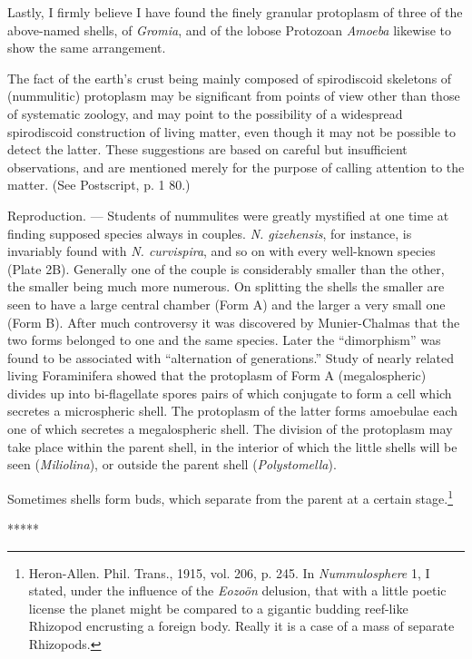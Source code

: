\documentclass[a4paper, 12pt, oneside]{article}
\begin{document}
Lastly, I firmly believe I have found the finely granular protoplasm of three of the above-named shells, of \emph{Gromia}, and of the lobose Protozoan \emph{Amoeba} likewise to show the same arrangement.

The fact of the earth's crust being mainly composed of spirodiscoid skeletons of (nummulitic) protoplasm may be significant from points of view other than those of systematic zoology, and may point to the possibility of a widespread spirodiscoid construction of living matter, even though it may not be possible to detect the latter. These suggestions are based on careful but insufficient observations, and are mentioned merely for the purpose of calling attention to the matter. (See Postscript, p. 1 80.)

Reproduction. --- Students of nummulites were greatly mystified at one time at finding supposed species always in couples. \emph{N. gizehensis}, for instance, is invariably found with \emph{N. curvispira}, and so on with every well-known species (Plate 2B). Generally one of the couple is considerably smaller than the other, the smaller being much more numerous. On splitting the shells the smaller are seen to have a large central chamber (Form A) and the larger a very small one (Form B). After much controversy it was discovered by Munier-Chalmas that the two forms belonged to one and the same species. Later the ``dimorphism'' was found to be associated with ``alternation of generations.'' Study of nearly related living Foraminifera showed that the protoplasm of Form A (megalospheric) divides up into bi-flagellate spores pairs of which conjugate to form a cell which secretes a microspheric shell. The protoplasm of the latter forms amoebulae each one of which secretes a megalospheric shell. The division of the protoplasm may take place within the parent shell, in the interior of which the little shells will be seen (\emph{Miliolina}), or outside the parent shell (\emph{Polystomella}).

Sometimes shells form buds, which separate from the parent at a certain stage.\footnote{Heron-Allen. Phil. Trans., 1915, vol. 206, p. 245. In \emph{Nummulosphere} 1, I stated, under the influence of the \emph{Eozoön} delusion, that with a little poetic license the planet might be compared to a gigantic budding reef-like Rhizopod encrusting a foreign body. Really it is a case of a mass of separate Rhizopods.}

\centerline{*\hspace{15mm}*\hspace{15mm}*\hspace{15mm}*\hspace{15mm}*}
\bigskip
\end{document}
